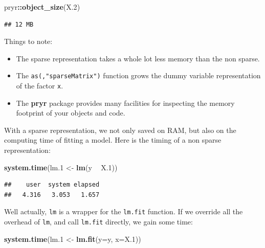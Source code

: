 \documentclass[]{book}
\newenvironment{Shaded}{\begin{snugshade}}{\end{snugshade}}
\newcommand{\DataTypeTok}[1]{\textcolor[rgb]{0.13,0.29,0.53}{#1}}
\newcommand{\FloatTok}[1]{\textcolor[rgb]{0.00,0.00,0.81}{#1}}
\newcommand{\KeywordTok}[1]{\textcolor[rgb]{0.13,0.29,0.53}{\textbf{#1}}}
\newcommand{\NormalTok}[1]{#1}
\newcommand{\OperatorTok}[1]{\textcolor[rgb]{0.81,0.36,0.00}{\textbf{#1}}}
\newcommand{\StringTok}[1]{\textcolor[rgb]{0.31,0.60,0.02}{#1}}
\providecommand{\tightlist}{%
  \setlength{\itemsep}{0pt}\setlength{\parskip}{0pt}}
\theoremstyle{definition}
\theoremstyle{definition}
\theoremstyle{definition}
\theoremstyle{remark}
\begin{document}
\begin{Shaded}
\begin{Highlighting}[]
\NormalTok{pryr}\OperatorTok{::}\KeywordTok{object_size}\NormalTok{(X}\FloatTok{.2}\NormalTok{)}
\end{Highlighting}
\end{Shaded}

\begin{verbatim}
## 12 MB
\end{verbatim}

Things to note:

\begin{itemize}
\tightlist
\item
  The sparse representation takes a whole lot less memory than the non sparse.
\item
  The \texttt{as(,"sparseMatrix")} function grows the dummy variable representation of the factor \texttt{x}.
\item
  The \textbf{pryr} package provides many facilities for inspecting the memory footprint of your objects and code.
\end{itemize}

With a sparse representation, we not only saved on RAM, but also on the computing time of fitting a model.
Here is the timing of a non sparse representation:

\begin{Shaded}
\begin{Highlighting}[]
\KeywordTok{system.time}\NormalTok{(lm}\FloatTok{.1}\NormalTok{ <-}\StringTok{ }\KeywordTok{lm}\NormalTok{(y }\OperatorTok{~}\StringTok{ }\NormalTok{X}\FloatTok{.1}\NormalTok{)) }
\end{Highlighting}
\end{Shaded}

\begin{verbatim}
##    user  system elapsed 
##   4.316   3.053   1.657
\end{verbatim}

Well actually, \texttt{lm} is a wrapper for the \texttt{lm.fit} function.
If we override all the overhead of \texttt{lm}, and call \texttt{lm.fit} directly, we gain some time:

\begin{Shaded}
\begin{Highlighting}[]
\KeywordTok{system.time}\NormalTok{(lm}\FloatTok{.1}\NormalTok{ <-}\StringTok{ }\KeywordTok{lm.fit}\NormalTok{(}\DataTypeTok{y=}\NormalTok{y, }\DataTypeTok{x=}\NormalTok{X}\FloatTok{.1}\NormalTok{))}
\end{Highlighting}
\end{Shaded}
\end{document}
